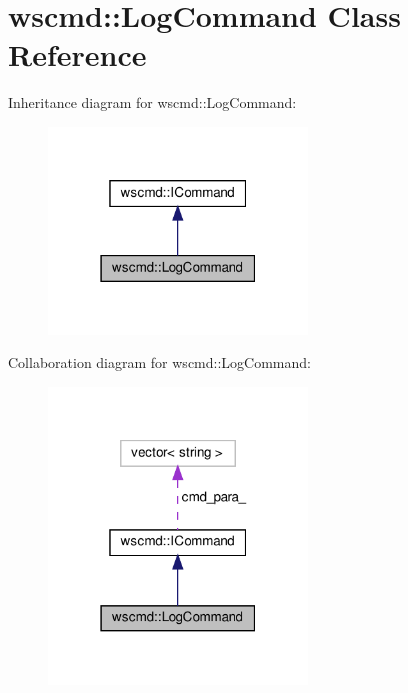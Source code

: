 \hypertarget{classwscmd_1_1LogCommand}{}\section{wscmd\+:\+:Log\+Command Class Reference}
\label{classwscmd_1_1LogCommand}


Inheritance diagram for wscmd\+:\+:Log\+Command\+:\nopagebreak
\begin{figure}[H]
\begin{center}
\leavevmode
\includegraphics[width=195pt]{classwscmd_1_1LogCommand__inherit__graph}
\end{center}
\end{figure}


Collaboration diagram for wscmd\+:\+:Log\+Command\+:\nopagebreak
\begin{figure}[H]
\begin{center}
\leavevmode
\includegraphics[width=195pt]{classwscmd_1_1LogCommand__coll__graph}
\end{center}
\end{figure}
